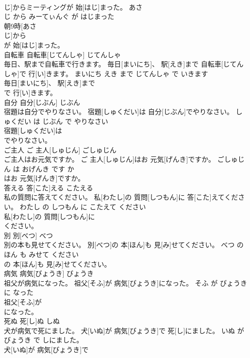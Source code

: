 \documentclass[8pt]{extreport}
\begin{document}
\begin{CJK}{UTF8}{min}
\\	じ]からミーティングが 始[はじ]まった。	あさ 
\\	じ から みーてぃんぐ が はじまった	
\\	朝9時[あさ 
\\	じ]から
\\	が 始[はじ]まった。		
\\	自転車	自転車[じてんしゃ]	じてんしゃ	
\\	毎日、駅まで自転車で行きます。	毎日[まいにち]、 駅[えき]まで 自転車[じてんしゃ]で 行[い]きます。	まいにち えき まで じてんしゃ で いきます	
\\	毎日[まいにち]、 駅[えき]まで
\\	で 行[い]きます。		
\\	自分	自分[じぶん]	じぶん	
\\	宿題は自分でやりなさい。	宿題[しゅくだい]は 自分[じぶん]でやりなさい。	しゅくだい は じぶん で やりなさい	
\\	宿題[しゅくだい]は
\\	でやりなさい。		
\\	ご主人	ご 主人[しゅじん]	ごしゅじん	
\\	ご主人はお元気ですか。	ご 主人[しゅじん]はお 元気[げんき]ですか。	ごしゅじん は おげんき です か	
\\	はお 元気[げんき]ですか。		
\\	答える	答[こた]える	こたえる	
\\	私の質問に答えてください。	私[わたし]の 質問[しつもん]に 答[こた]えてください。	わたし の しつもん に こたえて ください	
\\	私[わたし]の 質問[しつもん]に
\\	ください。		
\\	別	別[べつ]	べつ	
\\	別の本も見せてください。	別[べつ]の 本[ほん]も 見[み]せてください。	べつ の ほん も みせて ください	
\\	の 本[ほん]も 見[み]せてください。		
\\	病気	病気[びょうき]	びょうき	
\\	祖父が病気になった。	祖父[そふ]が 病気[びょうき]になった。	そふ が びょうき に なった	
\\	祖父[そふ]が
\\	になった。		
\\	死ぬ	死[し]ぬ	しぬ	
\\	犬が病気で死にました。	犬[いぬ]が 病気[びょうき]で 死[し]にました。	いぬ が びょうき で しにました。	
\\	犬[いぬ]が 病気[びょうき]で

\end{CJK}
\end{document}
